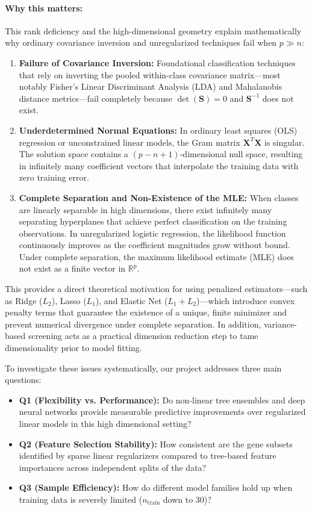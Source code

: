 \documentclass[11pt,a4paper]{article}
\begin{document}
\paragraph{Why this matters:}
This rank deficiency and the high-dimensional geometry explain mathematically why ordinary covariance inversion and unregularized techniques fail when $p \gg n$:
\begin{enumerate}
    \item \textbf{Failure of Covariance Inversion:} Foundational classification techniques that rely on inverting the pooled within-class covariance matrix—most notably Fisher's Linear Discriminant Analysis (LDA) and Mahalanobis distance metrics—fail completely because $\det(\mathbf{S}) = 0$ and $\mathbf{S}^{-1}$ does not exist.
    \item \textbf{Underdetermined Normal Equations:} In ordinary least squares (OLS) regression or unconstrained linear models, the Gram matrix $\mathbf{X}^T \mathbf{X}$ is singular. The solution space contains a $(p - n + 1)$-dimensional null space, resulting in infinitely many coefficient vectors that interpolate the training data with zero training error.
    \item \textbf{Complete Separation and Non-Existence of the MLE:} When classes are linearly separable in high dimensions, there exist infinitely many separating hyperplanes that achieve perfect classification on the training observations. In unregularized logistic regression, the likelihood function continuously improves as the coefficient magnitudes grow without bound. Under complete separation, the maximum likelihood estimate (MLE) does not exist as a finite vector in $\mathbb{R}^p$.
\end{enumerate}
This provides a direct theoretical motivation for using penalized estimators—such as Ridge ($L_2$), Lasso ($L_1$), and Elastic Net ($L_1 + L_2$)—which introduce convex penalty terms that guarantee the existence of a unique, finite minimizer and prevent numerical divergence under complete separation. In addition, variance-based screening acts as a practical dimension reduction step to tame dimensionality prior to model fitting.

To investigate these issues systematically, our project addresses three main questions:
\begin{itemize}
    \item \textbf{Q1 (Flexibility vs. Performance):} Do non-linear tree ensembles and deep neural networks provide measurable predictive improvements over regularized linear models in this high dimensional setting?
    \item \textbf{Q2 (Feature Selection Stability):} How consistent are the gene subsets identified by sparse linear regularizers compared to tree-based feature importances across independent splits of the data?
    \item \textbf{Q3 (Sample Efficiency):} How do different model families hold up when training data is severely limited ($n_{\text{train}}$ down to 30)?
\end{itemize}
\end{document}
